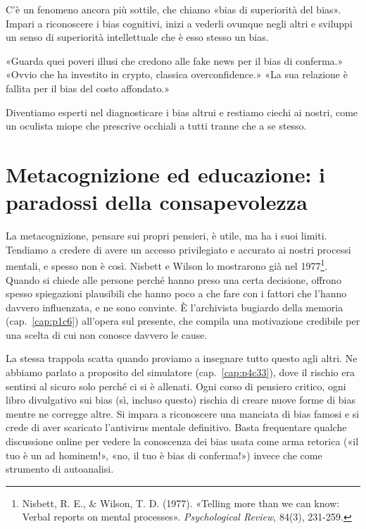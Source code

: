 C'è un fenomeno ancora più sottile, che chiamo «bias di superiorità del bias». Impari a riconoscere i bias cognitivi, inizi a vederli ovunque negli altri e sviluppi un senso di superiorità intellettuale che è esso stesso un bias.

«Guarda quei poveri illusi che credono alle fake news per il bias di conferma.»
«Ovvio che ha investito in crypto, classica overconfidence.»
«La sua relazione è fallita per il bias del costo affondato.»

Diventiamo esperti nel diagnosticare i bias altrui e restiamo ciechi ai nostri, come un oculista miope che prescrive occhiali a tutti tranne che a se stesso.

\section{Metacognizione ed educazione: i paradossi della consapevolezza}
\label{sec:p4c25-metacognizione}

La metacognizione, pensare sui propri pensieri, è utile, ma ha i suoi limiti. Tendiamo a credere di avere un accesso privilegiato e accurato ai nostri processi mentali, e spesso non è così. Nisbett e Wilson lo mostrarono già nel 1977\footnote{Nisbett, R. E., \& Wilson, T. D. (1977). «Telling more than we can know: Verbal reports on mental processes». \textit{Psychological Review}, 84(3), 231-259.}. Quando si chiede alle persone perché hanno preso una certa decisione, offrono spesso spiegazioni plausibili che hanno poco a che fare con i fattori che l'hanno davvero influenzata, e ne sono convinte. È l'archivista bugiardo della memoria (cap.~\ref{cap:p1c6}) all'opera sul presente, che compila una motivazione credibile per una scelta di cui non conosce davvero le cause.

La stessa trappola scatta quando proviamo a insegnare tutto questo agli altri. Ne abbiamo parlato a proposito del simulatore (cap.~\ref{cap:p4c33}), dove il rischio era sentirsi al sicuro solo perché ci si è allenati. Ogni corso di pensiero critico, ogni libro divulgativo sui bias (sì, incluso questo) rischia di creare nuove forme di bias mentre ne corregge altre. Si impara a riconoscere una manciata di bias famosi e si crede di aver scaricato l'antivirus mentale definitivo. Basta frequentare qualche discussione online per vedere la conoscenza dei bias usata come arma retorica («il tuo è un ad hominem!», «no, il tuo è bias di conferma!») invece che come strumento di autoanalisi.

